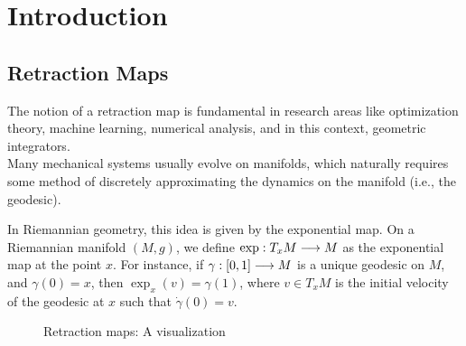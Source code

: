 % 
\chapter{Introduction} %
\label{chap:intro} %


%
\section{Retraction Maps} 
\label{sec:retr-intro} %

The notion of a retraction map is fundamental in research areas like optimization theory, machine learning, numerical analysis, and in this context, geometric integrators. \\ Many mechanical systems usually evolve on manifolds, which naturally requires some method of discretely approximating the dynamics on the manifold (i.e., the geodesic). 

In Riemannian geometry, this idea is given by the exponential map. On a Riemannian manifold $(M, g)$, we define $\exp: T_x M \longrightarrow M$ as the exponential map at the point $x$. For instance, if  $\gamma: [0, 1] \longrightarrow M$ is a unique geodesic on $M$, and $\gamma(0) = x$, then $\exp_x(v) = \gamma(1)$, where $v \in T_x M$ is the initial velocity of the geodesic at $x$ such that $\dot{\gamma}(0) = v$.

    \begin{figure}[h]
        \centering
        \caption{Retraction maps: A visualization}
            \label{fig:retraction}
        \end{figure}

